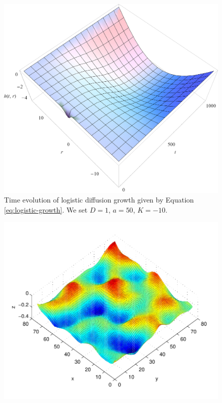 \documentclass[a0,portrait]{a0poster}
\begin{document}
\begin{multicols}{2}
	\begin{minipage}[b]{0.5\textwidth}
	\centering
      \begin{minipage}{0.43\linewidth}
          \begin{figure}[H]
              \includegraphics[width=\textwidth]{difuzija-logisticna-rast2.png}
              \caption{Time evolution of logistic diffusion growth given by Equation \ref{eq:logistic-growth}. We set $D = 1$, $a = 50$, $K = -10$.}
              \label{fig:logistic-growth}
          \end{figure}
      \end{minipage}
      \hspace{0.05\linewidth}
      \begin{minipage}{0.5\linewidth}
          \begin{figure}[H]
              \includegraphics[width=\textwidth]{KPZ-numericno.pdf}

\end{figure}
\end{minipage}
\end{minipage}
\end{multicols}
\end{document}
